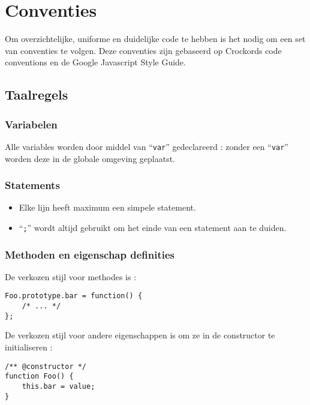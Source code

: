 \section{Conventies}

Om overzichtelijke, uniforme en duidelijke code te hebben is het nodig om een set van conventies te volgen.
Deze conventies zijn gebaseerd op Crockords code conventions\cite{ccd}
en de Google Javascript Style Guide\cite{gjsg}.

\subsection{Taalregels}

\subsubsection{Variabelen}

Alle variables worden door middel van ``\lstinline{var}'' gedeclareerd : zonder een ``\lstinline{var}'' worden deze in de globale omgeving geplaatst.

\subsubsection{Statements}

\begin{itemize}
  \item Elke lijn heeft maximum een simpele statement.
  \item ``\lstinline{;}'' wordt altijd gebruikt om het einde van een statement aan te duiden.
\end{itemize}

\subsubsection{Methoden en eigenschap definities}

De verkozen stijl voor methodes is :\\
\begin{lstlisting}
Foo.prototype.bar = function() {
    /* ... */
};
\end{lstlisting}

De verkozen stijl voor andere eigenschappen is om ze in de constructor te initialiseren :\\
\begin{lstlisting}
/** @constructor */
function Foo() {
    this.bar = value;
}
\end{lstlisting}

